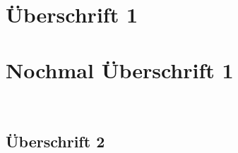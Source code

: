 \documentclass[11pt]{scrartcl}
\begin{document}
\section{Überschrift 1}
\blindtext
\section{Nochmal Überschrift 1}
\blindtext\\
\blindtext
\blindtext
\subsection{Überschrift 2}
\blindtext
\end{document}

